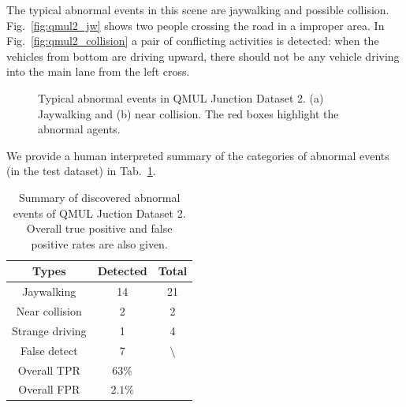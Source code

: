 The typical abnormal events in this scene are jaywalking and possible collision. Fig.~\ref{fig:qmul2_jw} shows two people crossing the road in a improper area. In Fig.~\ref{fig:qmul2_collision} a pair of conflicting activities is detected: when the vehicles from bottom are driving upward, there should not be any vehicle driving into the main lane from the left cross.
\begin{figure}
	\centering
	\hspace{0.5cm}
	\caption[Abnormal events in QMUL Junction Dataset 2]{Typical abnormal events in QMUL Junction Dataset 2. (a) Jaywalking and (b) near collision. The red boxes highlight the abnormal agents.}
	\label{fig:qmul2_abnormal}
\end{figure}

We provide a human interpreted summary of the categories of abnormal events (in the test dataset) in Tab.~\ref{tab:qmul2_discovered_abnormal}.
\clearpage
\newpage
\begin{table}[!ht]
	\begin{center}
		\renewcommand\arraystretch{2}
		\setlength{\tabcolsep}{8pt}
		\begin{tabular}{|c| c|c|}
			\hline
			Types			& Detected		& Total\\
			\hline
			Jaywalking		& 14			& 21\\
			Near collision  & 2				& 2\\
			Strange driving & 1				& 4\\
			False detect    & 7             & $\setminus$\\
			\hline
			Overall TPR     &$63\%$			&\\
			Overall FPR     &$2.1\%$			&\\
			\hline
		\end{tabular}
	\end{center}
	\caption[Summary of discovered abnormal events QMUL Juction Dataset 2]
	{Summary of discovered abnormal events of QMUL Juction Dataset 2. Overall true positive and false positive rates are also given.}
	\label{tab:qmul2_discovered_abnormal} 
\end{table}


